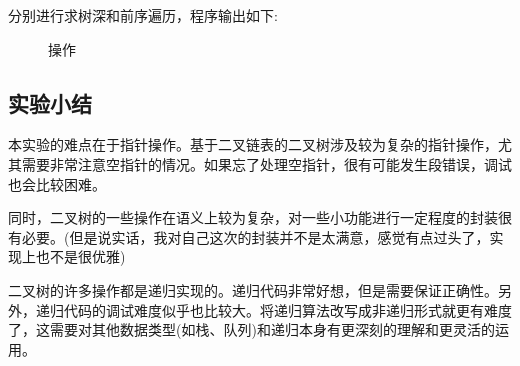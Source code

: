 \documentclass[supercite]{Experimental_Report}
\theoremstyle{definition}
\begin{document}
\clearpage
\noindent
分别进行求树深和前序遍历，程序输出如下:
\begin{figure}[htbp]
	\centering
	\vspace{2pt}
	\centering
	\caption{操作}
	\label{fig5-101}
\end{figure}

\newpage

\subsection{实验小结}

本实验的难点在于指针操作。基于二叉链表的二叉树涉及较为复杂的指针操作，尤其需要非常注意空指针的情况。如果忘了处理空指针，很有可能发生段错误，调试也会比较困难。

同时，二叉树的一些操作在语义上较为复杂，对一些小功能进行一定程度的封装很有必要。(但是说实话，我对自己这次的封装并不是太满意，感觉有点过头了，实现上也不是很优雅)

二叉树的许多操作都是递归实现的。递归代码非常好想，但是需要保证正确性。另外，递归代码的调试难度似乎也比较大。将递归算法改写成非递归形式就更有难度了，这需要对其他数据类型(如栈、队列)和递归本身有更深刻的理解和更灵活的运用。
\end{document}
